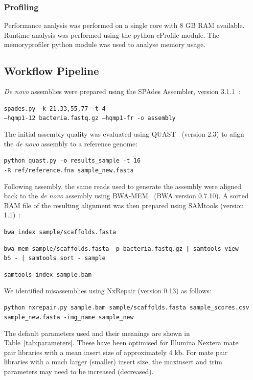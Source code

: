 \subsubsection*{Profiling}
Performance analysis was performed on a single core with 8 GB RAM available. Runtime analysis was performed using the python cProfile module. The memoryprofiler python module was used to analyse memory usage.

\subsection*{Workflow Pipeline}
\textit{De novo} assemblies were prepared using the SPAdes Assembler, version 3.1.1~\cite{Bankevich2012}:

\texttt{spades.py -k 21,33,55,77 -t 4 \\ --hqmp1-12 bacteria.fastq.gz  --hqmp1-fr -o assembly}

The initial assembly quality was evaluated using QUAST~\cite{gurevich2013} (version 2.3) to align the \textit{de novo} assembly to a reference genome:

\texttt{python quast.py -o results\_sample -t 16 \\  -R ref/reference.fna sample\_new.fasta }

  Following assembly, the same reads used to generate the assembly were aligned back to the \textit{de novo} assembly using BWA-MEM~\cite{li2013} (BWA version 0.7.10). A sorted BAM file of the resulting alignment was then prepared using SAMtools (version 1.1)~\cite{li2009}: 

\texttt{bwa index sample/scaffolds.fasta}

\texttt{bwa mem sample/scaffolds.fasta -p bacteria.fastq.gz | samtools view -bS - |  samtools sort - sample}

\texttt{samtools index sample.bam}

We identified misassemblies using NxRepair (version 0.13) as follows:

\texttt{python nxrepair.py sample.bam   sample/scaffolds.fasta sample\_scores.csv  sample\_new.fasta -img\_name sample\_new}


The default parameters used and their meanings are shown in Table~\ref{tab:parameters}. These have been optimised for Illumina Nextera mate pair libraries with a mean insert size of approximately 4 kb. For mate pair libraries with a much larger (smaller) insert size, the maxinsert and trim parameters may need to be increased (decreased).

